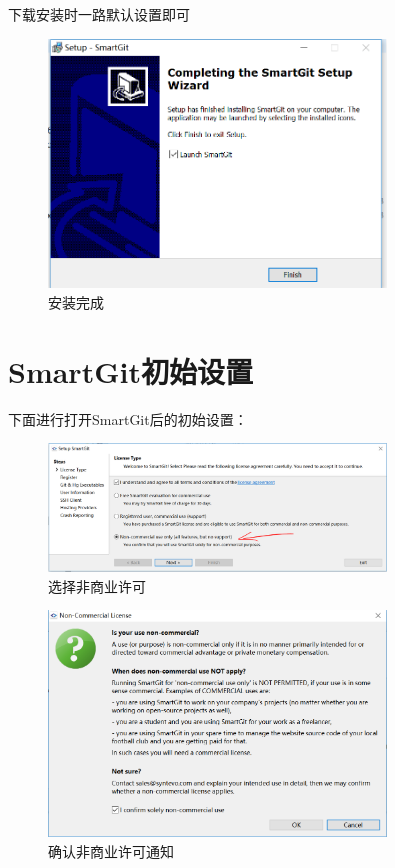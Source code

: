 \documentclass[10pt,a4paper,UTF8]{article}
\begin{document}
        下载安装时一路默认设置即可
        \begin{figure}[H]
            \centering
            \includegraphics[width=0.8\textwidth]{installed.PNG}
            \caption{安装完成}
        \end{figure}

    \newpage

    \section{SmartGit初始设置}
        下面进行打开SmartGit后的初始设置：
        \begin{figure}[H]
            \centering
            \includegraphics[width=0.8\textwidth]{non-commercial.PNG}
            \caption{选择非商业许可}
        \end{figure}

        \begin{figure}[H]
            \centering
            \includegraphics[width=0.8\textwidth]{confirm.PNG}
            \caption{确认非商业许可通知}
        \end{figure}
\end{document}
